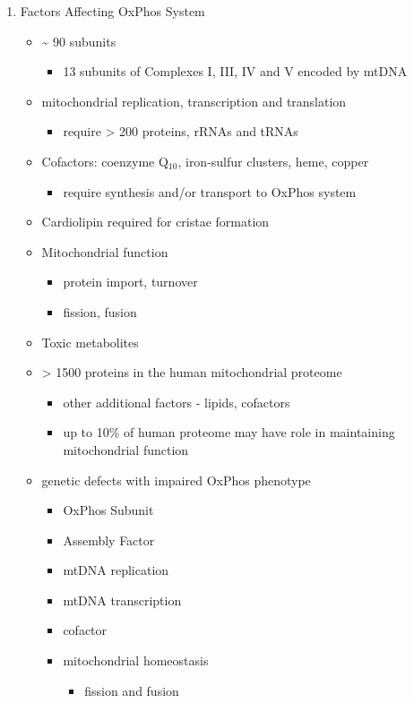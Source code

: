 \documentclass{scrartcl}
\begin{document}
\begin{enumerate}
\item Factors Affecting OxPhos System
\label{sec:org0782055}
\begin{itemize}
\item \textasciitilde{} 90 subunits
\begin{itemize}
\item 13 subunits of Complexes I, III, IV and V encoded by mtDNA
\end{itemize}
\item mitochondrial replication, transcription and translation
\begin{itemize}
\item require \textgreater{} 200 proteins, rRNAs and tRNAs
\end{itemize}
\item Cofactors: coenzyme Q\(_{\text{10}}\), iron-sulfur clusters, heme, copper
\begin{itemize}
\item require synthesis and/or transport to OxPhos system
\end{itemize}
\item Cardiolipin required for cristae formation
\item Mitochondrial function
\begin{itemize}
\item protein import, turnover
\item fission, fusion
\end{itemize}
\item Toxic metabolites
\item \textgreater{} 1500 proteins in the human mitochondrial proteome
\begin{itemize}
\item other additional factors - lipids, cofactors
\item up to 10\% of human proteome may have role in maintaining mitochondrial function
\end{itemize}

\item genetic defects with impaired OxPhos phenotype 
\begin{itemize}
\item OxPhos Subunit
\item Assembly Factor
\item mtDNA replication
\item mtDNA transcription
\item cofactor
\item mitochondrial homeostasis
\begin{itemize}
\item fission and fusion
\end{itemize}
\end{itemize}
\end{itemize}
\end{enumerate}
\end{document}
